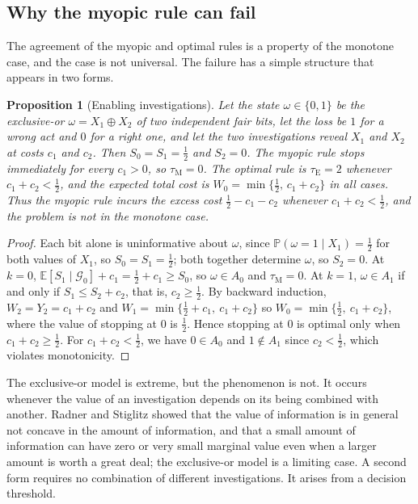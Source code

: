 \documentclass[11pt]{article}
\newcommand{\G}{\mathcal G}
\newcommand{\PP}{\mathbb P}
\newcommand{\E}{\mathbb E}
\newcommand{\tE}{\tau_{\mathrm E}}
\newcommand{\tM}{\tau_{\mathrm M}}
\theoremstyle{plain}
\newtheorem{proposition}{Proposition}
\theoremstyle{definition}
\begin{document}
\subsection{Why the myopic rule can fail}

The agreement of the myopic and optimal rules is a property of the monotone case, and the case is not universal. The failure has a simple structure that appears in two forms.

\begin{proposition}[Enabling investigations]\label{prop:xor}
Let the state $\omega\in\{0,1\}$ be the exclusive-or $\omega=X_1\oplus X_2$ of two independent fair bits, let the loss be $1$ for a wrong act and $0$ for a right one, and let the two investigations reveal $X_1$ and $X_2$ at costs $c_1$ and $c_2$. Then $S_0=S_1=\tfrac12$ and $S_2=0$. The myopic rule stops immediately for every $c_1>0$, so $\tM=0$. The optimal rule is $\tE=2$ whenever $c_1+c_2<\tfrac12$, and the expected total cost is $W_0=\min\{\tfrac12,\,c_1+c_2\}$ in all cases. Thus the myopic rule incurs the excess cost $\tfrac12-c_1-c_2$ whenever $c_1+c_2<\tfrac12$, and the problem is not in the monotone case.
\end{proposition}

\begin{proof}
Each bit alone is uninformative about $\omega$, since $\PP(\omega=1\mid X_1)=\tfrac12$ for both values of $X_1$, so $S_0=S_1=\tfrac12$; both together determine $\omega$, so $S_2=0$. At $k=0$, $\E[S_1\mid\G_0]+c_1=\tfrac12+c_1\ge S_0$, so $\omega\in A_0$ and $\tM=0$. At $k=1$, $\omega\in A_1$ if and only if $S_1\le S_2+c_2$, that is, $c_2\ge\tfrac12$. By backward induction, $W_2=Y_2=c_1+c_2$ and $W_1=\min\{\tfrac12+c_1,\ c_1+c_2\}$ so $W_0=\min\{\tfrac12,\ c_1+c_2\}$, where the value of stopping at 0 is $\tfrac12$. Hence stopping at 0 is optimal only when $c_1+c_2\ge\tfrac12$. For $c_1+c_2<\tfrac12$, we have $0\in A_0$ and $1\notin A_1$ since $c_2<\tfrac12$, which violates monotonicity.
\end{proof}

The exclusive-or model is extreme, but the phenomenon is not. It occurs whenever the value of an investigation depends on its being combined with another. Radner and Stiglitz \cite{radner1984nonconcavity} showed that the value of information is in general not concave in the amount of information, and that a small amount of information can have zero or very small marginal value even when a larger amount is worth a great deal; the exclusive-or model is a limiting case. A second form requires no combination of different investigations. It arises from a decision threshold.
\end{document}
